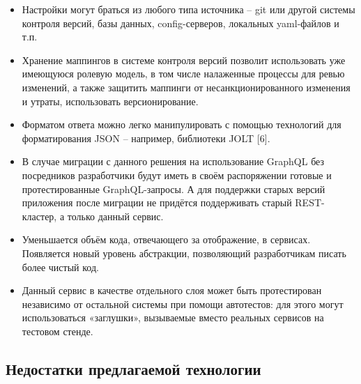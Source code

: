 \begin{itemize}
	\item Настройки могут браться из любого типа источника – git или другой системы контроля версий, базы данных, config-серверов, локальных yaml-файлов и т.п.
	\item Хранение маппингов в системе контроля версий позволит использовать уже имеющуюся ролевую модель, в том числе налаженные процессы для ревью изменений, а также защитить маппинги от несанкционированного изменения и утраты, использовать версионирование.
	\item Форматом ответа можно легко манипулировать с помощью технологий для форматирования JSON – например, библиотеки JOLT [6].
	\item В случае миграции с данного решения на использование GraphQL без посредников разработчики будут иметь в своём распоряжении готовые и протестированные GraphQL-запросы.
	А для поддержки старых версий приложения после миграции не придётся поддерживать старый REST-кластер, а только данный сервис.
	\item Уменьшается объём кода, отвечающего за отображение, в сервисах.
	Появляется новый уровень абстракции, позволяющий разработчикам писать более чистый код.
	\item Данный сервис в качестве отдельного слоя может быть протестирован независимо от остальной системы при помощи автотестов: для этого могут использоваться «заглушки», вызываемые вместо реальных сервисов на тестовом стенде.
\end{itemize}

\subsection{Недостатки предлагаемой технологии}\label{subsec:proposed-technology-disadvantages}

